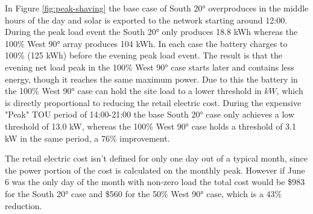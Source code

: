\documentclass[journal,article,submit,pdftex,moreauthors]{Definitions/mdpi}
\begin{document}
In Figure \ref{fig:peak-shaving} the base case of South 20° overproduces in the middle hours
of the day and solar is exported to the network starting around 12:00.
During the peak load event the South 20° only produces 18.8 kWh whereas
the 100\% West 90° array produces 104 kWh. In each case the battery
charges to 100\% (125 kWh) before the evening peak load event. The
result is that the evening net load peak in the 100\% West 90° case
starts later and contains less energy, though it reaches the same
maximum power. Due to this the battery in the 100\% West 90° case can
hold the site load to a lower threshold in \(kW\), which is directly
proportional to reducing the retail electric cost. During the expensive
"Peak" TOU period of 14:00-21:00 the base South 20° case only achieves a
low threshold of 13.0 kW, whereas the 100\% West 90° case holds a
threshold of 3.1 kW in the same period, a 76\% improvement.

The retail electric cost isn't defined for only one day out of a typical
month, since the power portion of the cost is calculated on the monthly
peak. However if June 6 was the only day of the month with non-zero load
the total cost would be \$983 for the South 20° case and \$560 for the
50\% West 90° case, which is a 43\% reduction.
\end{document}
